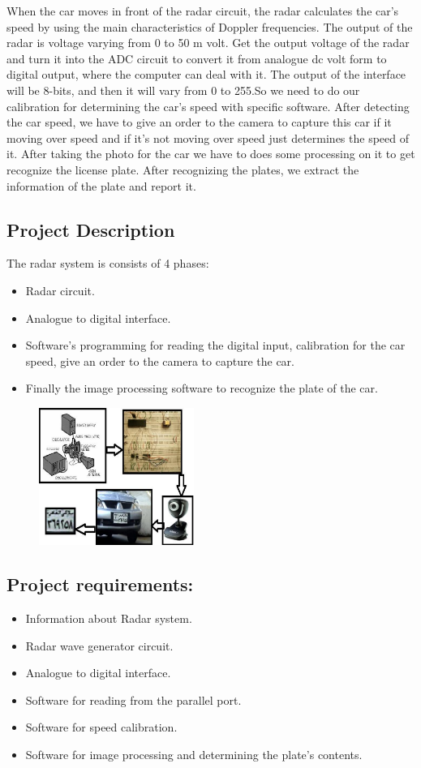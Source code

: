 \noindent When the car moves in front of the radar circuit, the radar
calculates the car's speed by using the main characteristics of
Doppler frequencies. The output of the radar is voltage varying
from 0 to 50 m volt. Get the output voltage of the radar and turn
it into the ADC circuit to convert it from analogue dc volt form
to digital output, where the computer can deal with it. The
output of the interface will be 8-bits, and then it will vary from 0
to 255.So we need to do our calibration for determining the car's
speed with specific software. After detecting the car speed, we
have to give an order to the camera to capture this car if it
moving over speed and if it's not moving over speed just
determines the speed of it. After taking the photo for the car we
have to does some processing on it to get recognize the license
plate. After recognizing the plates, we extract the information of
the plate and report it.

\subsection*{Project Description}
The radar system is consists of 4 phases:
\begin{itemize}
	\item Radar circuit.
	\item Analogue to digital interface. 
	\item Software's programming for reading the digital input,
	calibration for the car speed, give an order to the camera to
	capture the car. 
	\item Finally the image processing software to recognize the
	plate of the car.
\end{itemize}
\begin{figure}[b]
	\centering
	\includegraphics[width=0.45\textwidth]{figure1.png}
\end{figure}

\subsection{Project requirements:}
\begin{itemize}
	\item Information about Radar system.
	\item Radar wave generator circuit.
	\item Analogue to digital interface.
	\item Software for reading from the parallel port.
	\item Software for speed calibration.
	\item Software for image processing and determining the
	plate's contents.
\end{itemize}


